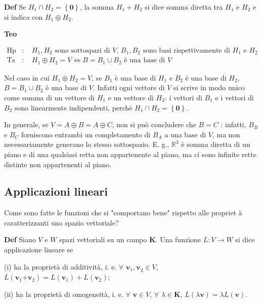 \documentclass{article}
\begin{document}
\textbf{Def} Se $H_{1}\cap H_{2}=\left\{ \mathbf{0}\right\} $, la somma $%
H_{1}+H_{2}$ si dice somma diretta tra $H_{1}$ e $H_{2}$ e si indica con $%
H_{1}\oplus H_{2}$.

\textbf{Teo}

\begin{eqnarray*}
\text{Hp} &\text{: }&H_{1},H_{2}\text{ sono sottospazi di }V\text{, }%
B_{1},B_{2}\text{ sono basi rispettivamente di }H_{1}\text{ e }H_{2} \\
\text{Ts} &\text{: }&H_{1}\oplus H_{2}=V\Longleftrightarrow B=B_{1}\cup B_{2}%
\text{ \`{e} una base di }V
\end{eqnarray*}

Nel caso in cui $H_{1}\oplus H_{2}=V$, se $B_{1}$ \`{e} una base di $H_{1}$
e $B_{2}$ \`{e} una base di $H_{2}$, $B=B_{1}\cup B_{2}$ \`{e} una base di $%
V $. Infatti ogni vettore di $V$ si scrive in modo unico come somma di un
vettore di $H_{1}$ e un vettore di $H_{2}$: i vettori di $B_{1}$ e i vettori
di $B_{2}$ sono linearmente indipendenti, perch\'{e} $H_{1}\cap
H_{2}=\left\{ \mathbf{0}\right\} $.

In generale, se $V=A\oplus B=A\oplus C$, non si pu\`{o} concludere che $B=C$%
: infatti, $B_{B}$ e $B_{C}$ forniscono entrambi un completamento di $B_{A}$
a una base di $V$, ma non necessariamente generano lo stesso sottospazio. E.
g., $%
\mathbb{R}
^{3}$ \`{e} somma diretta di un piano e di una qualsiasi retta non
appartenente al piano, ma ci sono infinite rette distinte non appartenenti
al piano.

\subsection{Applicazioni lineari}

Come sono fatte le funzioni che si "comportano bene" rispetto alle propriet%
\`{a} caratterizzanti uno spazio vettoriale?

\textbf{Def} Siano $V$ e $W$ spazi vettoriali su un campo $\mathbf{K}$. Una
funzione $L:V\rightarrow W$ si dice applicazione lineare se

(i) ha la propriet\`{a} di additivit\`{a}, i. e. $\forall $ $\mathbf{v}_{1}%
\mathbf{,v}_{2}\in V$, $L\left( \mathbf{v}_{1}\mathbf{+v}_{2}\right)
=L\left( \mathbf{v}_{1}\right) +L\left( \mathbf{v}_{2}\right) $;

(ii) ha la propriet\`{a} di omogeneit\`{a}, i. e. $\forall $ $\mathbf{v}\in V
$, $\forall $ $\lambda \in \mathbf{K}$, $L\left( \lambda \mathbf{v}\right)
=\lambda L\left( \mathbf{v}\right) $.
\end{document}
